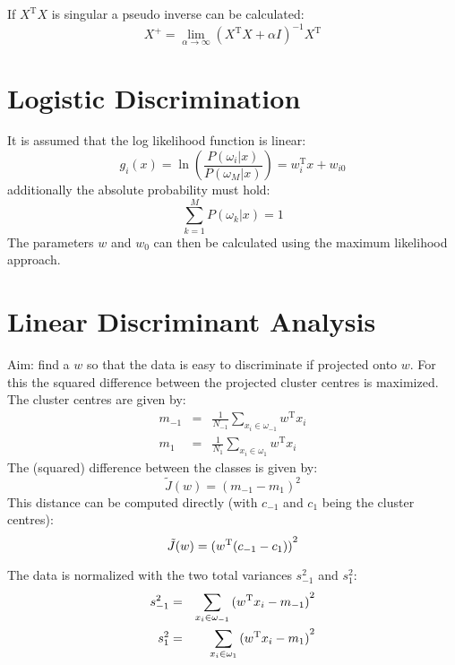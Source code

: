 If $X^\text{T}X$ is singular a pseudo inverse can be calculated:
\begin{equation*}
    X^+ = \lim_{\alpha \to \infty} {(X^\text{T} X + \alpha I)}^{-1} X^\text{T}
\end{equation*}

\section{Logistic Discrimination}
It is assumed that the log likelihood function is linear:
\begin{equation*}
    g_i(x) = \ln \left( \frac{P(\omega_i | x)}{P(\omega_M | x)} \right) = w^\text{T}_i x + w_{i0}
\end{equation*}
additionally the absolute probability must hold:
\begin{equation*}
    \sum_{k=1}^M P(\omega_k | x) = 1
\end{equation*}
The parameters $w$ and $w_0$ can then be calculated using the maximum likelihood approach.

\section{Linear Discriminant Analysis}
Aim: find a $w$ so that the data is easy to discriminate if projected onto $w$. For this the squared difference between the projected cluster centres is maximized. The cluster centres are given by:
\begin{eqnarray*}
    m_{-1} &=& \frac{1}{N_{-1}} \sum_{x_i \in \omega_{-1}} w^\text{T} x_i \\
    m_{1} &=& \frac{1}{N_{1}} \sum_{x_i \in \omega_{1}} w^\text{T} x_i
\end{eqnarray*}
The (squared) difference between the classes is given by:
\begin{equation*}
    \tilde{J}(w) = {(m_{-1} - m_1)}^2
\end{equation*}
This distance can be computed directly (with $c_{-1}$ and $c_1$ being the cluster centres):
\begin{equation*}
    \tilde{J}(w) = {(w^\text{T} (c_{-1} - c_1))}^2
\end{equation*}

The data is normalized with the two total variances $s_{-1}^2$ and $s_1^2$:
\begin{eqnarray*}
    s_{-1}^2 &=& \sum_{x_i \in \omega_{-1}} {(w^\text{T}x_i - m_{-1})}^2 \\
    s_{1}^2 &=& \sum_{x_i \in \omega_{1}} {(w^\text{T}x_i - m_{1})}^2 \\
\end{eqnarray*}


